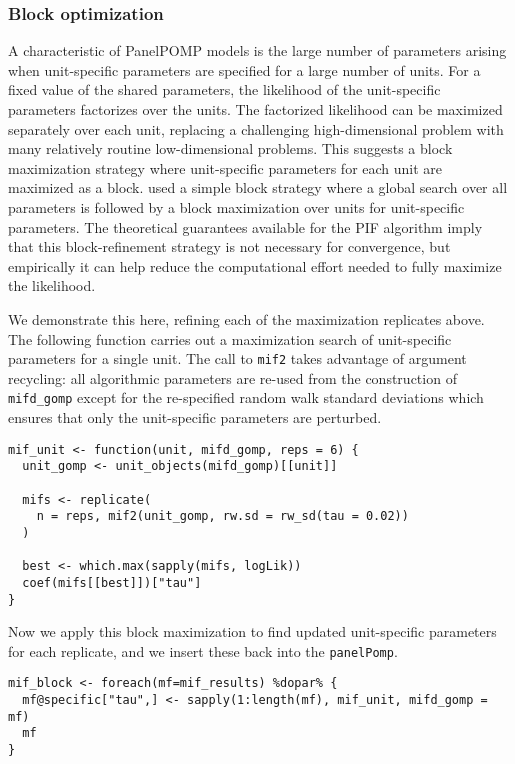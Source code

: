\subsubsection{Block optimization}\label{block-optimization}

A characteristic of PanelPOMP models is the large number of parameters arising when unit-specific parameters are specified for a large number of units.
For a fixed value of the shared parameters, the likelihood of the unit-specific parameters factorizes over the units.
The factorized likelihood can be maximized separately over each unit, replacing a challenging high-dimensional problem with many relatively routine low-dimensional problems.
This suggests a block maximization strategy where unit-specific parameters for each unit are maximized as a block.
\citet{breto20} used a simple block strategy where a global search over all parameters is followed by a block maximization over units for unit-specific parameters.
The theoretical guarantees available for the PIF algorithm \citep{breto20} imply that this block-refinement strategy is not necessary for convergence, but empirically it can help reduce the computational effort needed to fully maximize the likelihood.

We demonstrate this here, refining each of the maximization replicates above.
The following function carries out a maximization search of unit-specific parameters for a single unit.
The call to \texttt{mif2} takes advantage of argument recycling: all algorithmic parameters are re-used from the construction of \texttt{mifd\_gomp} except for the re-specified random walk standard deviations which ensures that only the unit-specific parameters are perturbed.

\begin{verbatim}
mif_unit <- function(unit, mifd_gomp, reps = 6) {
  unit_gomp <- unit_objects(mifd_gomp)[[unit]]

  mifs <- replicate(
    n = reps, mif2(unit_gomp, rw.sd = rw_sd(tau = 0.02))
  )

  best <- which.max(sapply(mifs, logLik))
  coef(mifs[[best]])["tau"]
}
\end{verbatim}

Now we apply this block maximization to find updated unit-specific parameters for each replicate, and we insert these back into the \texttt{panelPomp}.

\begin{verbatim}
mif_block <- foreach(mf=mif_results) %dopar% {
  mf@specific["tau",] <- sapply(1:length(mf), mif_unit, mifd_gomp = mf)
  mf
}
\end{verbatim}

